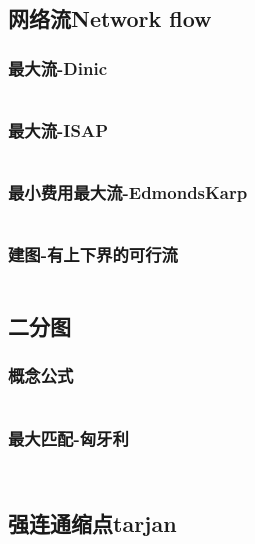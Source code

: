 \documentclass[twoside,sub3section,UTF8]{ctexart}						%
\begin{document}
	\subsection{网络流Network flow}
		\subsubsection{最大流-Dinic}
			\inputminted{c++}{"Gragh Theory/Network Flow/dinic.cpp"}
		\subsubsection{最大流-ISAP}
			\inputminted{c++}{"Gragh Theory/Network Flow/ISAP.cpp"}
		\subsubsection{最小费用最大流-EdmondsKarp}
			\inputminted{c++}{"Gragh Theory/Network Flow/MCMF.cpp"}
		\subsubsection{建图-有上下界的可行流}
			\inputminted{c++}{"Gragh Theory/Network Flow/lowup.cpp"}

	\subsection{二分图}
		\subsubsection{概念公式}
			\inputminted{c++}{"Gragh Theory/Bipartite gragh/emmm.cpp"}
		\subsubsection{最大匹配-匈牙利}
			\inputminted{c++}{"Gragh Theory/Bipartite gragh/hungary.cpp"}
			\inputminted{c++}{"Gragh Theory/Bipartite gragh/hungarymatrix.cpp"}
	
	\subsection{强连通缩点tarjan}
		\inputminted{c++}{"Gragh Theory/SCC.cpp"}
\end{document}
